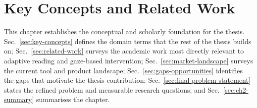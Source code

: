 \chapter{Key Concepts and Related Work}
\label{ch:key-concepts-related-work}

This chapter establishes the conceptual and scholarly foundation for the thesis.
Sec.~\ref{sec:key-concepts} defines the domain terms that the rest of the thesis builds on;
Sec.~\ref{sec:related-work} surveys the academic work most directly relevant to adaptive reading and gaze-based intervention;
Sec.~\ref{sec:market-landscape} surveys the current tool and product landscape;
Sec.~\ref{sec:gaps-opportunities} identifies the gaps that motivate the thesis contribution;
Sec.~\ref{sec:final-problem-statement} states the refined problem and measurable research questions;
and Sec.~\ref{sec:ch2-summary} summarises the chapter.







